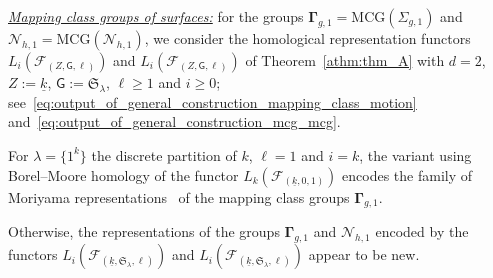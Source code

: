 \documentclass[AHL,Unicode,published]{cedram}
\newcommand{\MCG}{\mathrm{MCG}}
\newcommand{\MCGo}{\mathbf{\Gamma}}
\newcommand{\MCGno}{\boldsymbol{\mathcal{N}}}
\newcommand{\Sym}{\mathfrak{S}}
\newcommand{\sF}{\mathscr{F}}
\newcommand{\N}{\mathscr{N}}
\newcommand{\sG}{\mathsf{G}}
\newcommand{\cF}{\mathcal{F}}
\renewcommand{\geq}{\geqslant}
\begin{document}
\noindent\underline{\emph{Mapping class groups of surfaces:}} for the groups $\MCGo_{g,1}=\MCG(\Sigma_{g,1})$ and $\MCGno_{h,1}=\MCG(\N_{h,1})$, we consider the homological representation functors $L_{i}(\cF_{(Z,\sG,\ell)})$ and $L_{i}(\sF_{(Z,\sG,\ell)})$ of Theorem~\ref{athm:thm_A} with $d=2$, $Z:=\underline{k}$, $\sG:=\Sym_{\lambda}$, $\ell\geq 1$ and $i\geq 0$; see~\eqref{eq:output_of_general_construction_mapping_class_motion} and~\eqref{eq:output_of_general_construction_mcg_mcg}.

\begin{theo}\label{athm:thm_C_MCG}
For $\lambda = \boldsymbol{\{} 1^{k}\boldsymbol{\}}$ the discrete partition of $k$, $\ell = 1$ and $i=k$, the variant using Borel--Moore homology of the functor $L_{k}(\cF_{(\underline{k},0,1)})$ encodes the family of Moriyama representations~\cite{Moriyama} of the mapping class groups $\MCGo_{g,1}$.

Otherwise, the representations of the groups $\MCGo_{g,1}$ and $\MCGno_{h,1}$ encoded by the functors $L_{i}(\cF_{(\underline{k},\Sym_{\lambda},\ell)})$ and $L_{i}(\sF_{(\underline{k},\Sym_{\lambda},\ell)})$ appear to be new.
\end{theo}
\end{document}
